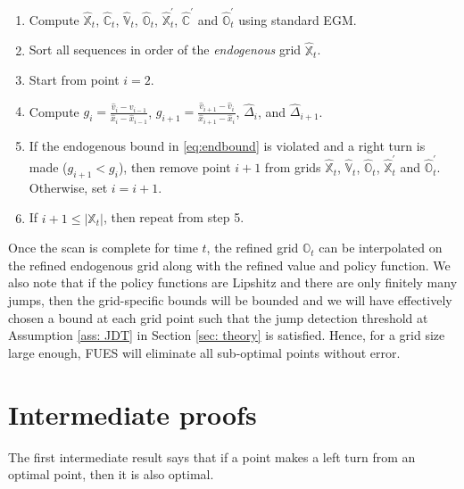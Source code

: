 \documentclass[12pt]{article}
\begin{document}
\begin{tcolorbox}[
colframe=black!100,
colback=white!10,
coltitle=white!100!black,  
fonttitle=\bfseries,
adjusted title= Box 2: FUES method with endogenous jump detection]
\begin{enumerate}
    \item Compute $\hat{\mathbb{X}}_{t}$, $\hat{\mathbb{C}}_{t}$, $\hat{\mathbb{V}}_{t}$, $\hat{\mathbb{O}}_{t}$, $\hat{\mathbb{X}}_{t}^{\prime}$, $\hat{\mathbb{C}}^{\prime}$ and $\hat{\mathbb{O}}_{t}^{\prime}$  using standard EGM.
    \item Sort all sequences in order of the \textit{endogenous} grid $\hat{\mathbb{X}}_{t}$.
    \item Start from point $i= 2$.
    \item Compute $g_{i} = \frac{\hat{v}_{i} - \hat{v}_{i-1}}{\hat{x}_{i}- \hat{x}_{i-1}}$, $g_{i+1} = \frac{\hat{v}_{i+1} - \hat{v}_{i}}{\hat{x}_{i+1}- \hat{x}_{i}}$, $\hat{\Delta}_{i}$, and $\hat{\Delta}_{i+1} $.
    \item If the endogenous bound in \eqref{eq:endbound} is violated and a right turn is made ($g_{i+1}< g_{i}$), then remove point $i+1$ from grids $\hat{\mathbb{X}}_{t}$, $\hat{\mathbb{V}}_{t}$, $\hat{\mathbb{O}}_{t}$, $\hat{\mathbb{X}}_{t}^{\prime}$ and $\hat{\mathbb{O}}_{t}^{\prime}$. Otherwise, set $i= i+1$. 
    \item If $i+1\leq \vert \hat{\mathbb{X}}_{t}\vert$, then repeat from step 5. 
\end{enumerate}
\end{tcolorbox}

Once the scan is complete for time $t$, the refined grid $\mathbb{O}_{t}$ can be interpolated on the refined endogenous grid along with the refined value and policy function. We also note that if the policy functions are Lipshitz and there are only finitely many jumps, then the grid-specific bounds will be bounded and we will have effectively chosen a bound at each grid point such that the jump detection threshold at Assumption \ref{ass: JDT} in Section \ref{sec: theory} is satisfied. Hence, for a grid size large enough, FUES will eliminate all sub-optimal points without error. 


\section{Intermediate proofs}

The first intermediate result says that if a point makes a left turn from an optimal point, then it is also optimal. 
\end{document}
